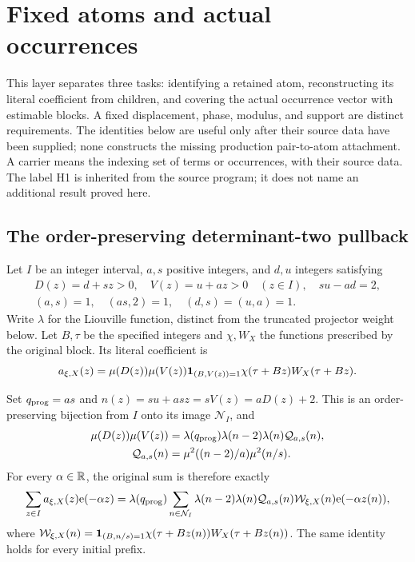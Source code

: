 \section{Fixed atoms and actual occurrences}\label{sec:structure}
This layer separates three tasks: identifying a retained atom, reconstructing its literal coefficient from children, and covering the actual occurrence vector with estimable blocks. A fixed displacement, phase, modulus, and support are distinct requirements. The identities below are useful only after their source data have been supplied; none constructs the missing production pair-to-atom attachment. A carrier means the indexing set of terms or occurrences, with their source data. The label H1 is inherited from the source program; it does not name an additional result proved here.

\subsection{The order-preserving determinant-two pullback}
Let $I$ be an integer interval, $a,s$ positive integers, and $d,u$ integers satisfying
\[
\begin{gathered}
D(z)=d+sz>0,\quad V(z)=u+az>0\quad(z\in I),\quad su-ad=2,\\
(a,s)=1,\quad(as,2)=1,\quad(d,s)=(u,a)=1.
\end{gathered}
\]
Write $\lambda$ for the Liouville function, distinct from the truncated projector weight below. Let $B,\tau$ be the specified integers and $\chi,W_X$ the functions prescribed by the original block. Its literal coefficient is
\[
a_{\xi,X}(z)=\mu(D(z))\mu(V(z))\mathbf 1_{(B,V(z))=1}\chi(\tau+Bz)W_X(\tau+Bz).
\]
\begin{proposition}\label{prop:pullback}
Set $q_{\rm prog}=as$ and $n(z)=su+as z=sV(z)=aD(z)+2$. This is an order-preserving bijection from $I$ onto its image $\mathcal N_I$, and
\begin{align*}
\mu(D(z))\mu(V(z))&=\lambda(q_{\rm prog})\lambda(n-2)\lambda(n)\mathcal Q_{a,s}(n),\\
\mathcal Q_{a,s}(n)&=\mu^2((n-2)/a)\mu^2(n/s).
\end{align*}
For every $\alpha\in\mathbb R$, the original sum is therefore exactly
\[
\sum_{z\in I}a_{\xi,X}(z)\mathrm e(-\alpha z)
=\lambda(q_{\rm prog})\sum_{n\in\mathcal N_I}
\lambda(n-2)\lambda(n)\mathcal Q_{a,s}(n)\mathcal W_{\xi,X}(n)\mathrm e(-\alpha z(n)),
\]
where $\mathcal W_{\xi,X}(n)=\mathbf 1_{(B,n/s)=1}\chi(\tau+Bz(n))W_X(\tau+Bz(n))$. The same identity holds for every initial prefix.
\end{proposition}

